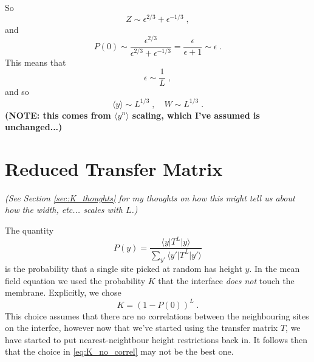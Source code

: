 \documentclass[a4paper,10pt]{article}
\newcommand{\D}{\mathrm{d}}
\newcommand{\bra}[1]{\langle #1 \vert}
\newcommand{\ket}[1]{\vert #1 \rangle}
\newcommand{\Ai}{\mathrm{Ai}}
\begin{document}
So
\begin{equation}
  Z \sim \epsilon^{2/3} + \epsilon^{-1/3} \;,
\end{equation}
and
\begin{equation}
  P(0) \sim \frac{\epsilon^{2/3}}{\epsilon^{2/3} + \epsilon^{-1/3}} = \frac{\epsilon}{\epsilon + 1} \sim \epsilon \;.
\end{equation}
This means that
\begin{equation}
  \epsilon \sim \frac{1}{L} \;,
\end{equation}
and so
\begin{equation}
  \langle y \rangle \sim L^{1/3} \;, \quad W \sim L^{1/3} \;.
\end{equation}
{\bf (NOTE: this comes from $\langle y^n \rangle$ scaling, which I've assumed is unchanged...)}

\section{Reduced Transfer Matrix}

\emph{(See Section \ref{sec:K_thoughts} for my thoughts on how this might tell us about how the width, etc... scales with $L$.)}\newline

The quantity
\begin{equation}
  P(y) = \frac{ \bra{y} T^L \ket{y} }{ \sum_{y'} \bra{y'} T^L \ket{y'} }
\end{equation}
is the probability that a single site picked at random has height $y$. In the mean field equation we used the probability $K$ that the interface \emph{does not} touch the membrane. Explicitly, we chose
\begin{equation}\label{eq:K_no_correl}
  K = (1-P(0))^L \;.
\end{equation}
This choice assumes that there are no correlations between the neighbouring sites on the interfce, however now that we've started using the transfer matrix $T$, we have started to put nearest-neightbour height restrictions back in. It follows then that the choice in \eqref{eq:K_no_correl} may not be the best one.
\end{document}
